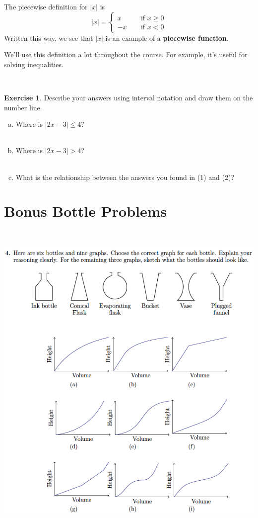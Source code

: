\documentclass[11pt,reqno,final]{amsart}
\numberwithin{equation}{section}
\numberwithin{figure}{section}
\theoremstyle{definition} %
\newtheorem{exercise}[question]{Exercise}
\begin{document}
\newpage

\begin{framed}
        The piecewise definition for $|x|$ is
        \[
                |x| =
                \begin{cases}
                        x \qquad & \mbox{if $x \geq 0$}\\
                        -x & \mbox{if $x < 0$}
                \end{cases}
        \]
        Written this way, we see that $|x|$ is an example of a \textbf{piecewise function}.
\end{framed}
We'll use this definition a lot throughout the course.  For example, it's useful for solving inequalities.

$ $

\begin{exercise}
        Describe your answers using interval notation and draw them on the number line.
        \begin{enumerate}[(a)]
        \item Where is $|2x-3|\leq 4$? \\
                \vspace{30pt}\\
        \item Where is $|2x-3|>4$?\\
                \vspace{30pt}\\
        \item What is the relationship between the answers you found in (1) and (2)?
        \end{enumerate}
\end{exercise}


\newpage

\section{Bonus Bottle Problems}

$ $

\includegraphics[width=\textwidth]{09-04P_FillingBottles2.png}

\newpage
\end{document}
